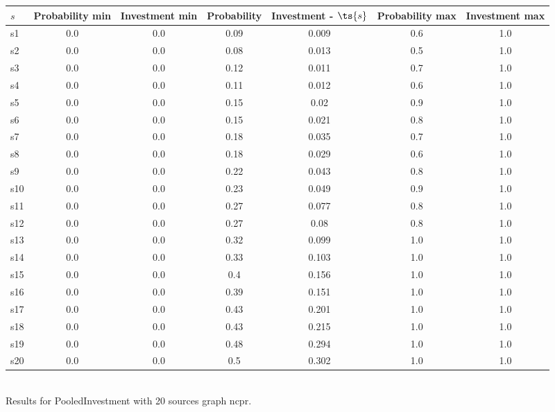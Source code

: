 \documentclass{article}
\begin{document}
\noindent\begin{tabular}{|l|c|c|c|c|c|c|}
\hline
$s$& Probability min & Investment min & Probability & Investment - $\ts{s}$ & Probability max & Investment max\\
\hline
s1 &0.0 & 0.0 & 0.09 & 0.009 & 0.6 & 1.0\\
\hline
s2 &0.0 & 0.0 & 0.08 & 0.013 & 0.5 & 1.0\\
\hline
s3 &0.0 & 0.0 & 0.12 & 0.011 & 0.7 & 1.0\\
\hline
s4 &0.0 & 0.0 & 0.11 & 0.012 & 0.6 & 1.0\\
\hline
s5 &0.0 & 0.0 & 0.15 & 0.02 & 0.9 & 1.0\\
\hline
s6 &0.0 & 0.0 & 0.15 & 0.021 & 0.8 & 1.0\\
\hline
s7 &0.0 & 0.0 & 0.18 & 0.035 & 0.7 & 1.0\\
\hline
s8 &0.0 & 0.0 & 0.18 & 0.029 & 0.6 & 1.0\\
\hline
s9 &0.0 & 0.0 & 0.22 & 0.043 & 0.8 & 1.0\\
\hline
s10 &0.0 & 0.0 & 0.23 & 0.049 & 0.9 & 1.0\\
\hline
s11 &0.0 & 0.0 & 0.27 & 0.077 & 0.8 & 1.0\\
\hline
s12 &0.0 & 0.0 & 0.27 & 0.08 & 0.8 & 1.0\\
\hline
s13 &0.0 & 0.0 & 0.32 & 0.099 & 1.0 & 1.0\\
\hline
s14 &0.0 & 0.0 & 0.33 & 0.103 & 1.0 & 1.0\\
\hline
s15 &0.0 & 0.0 & 0.4 & 0.156 & 1.0 & 1.0\\
\hline
s16 &0.0 & 0.0 & 0.39 & 0.151 & 1.0 & 1.0\\
\hline
s17 &0.0 & 0.0 & 0.43 & 0.201 & 1.0 & 1.0\\
\hline
s18 &0.0 & 0.0 & 0.43 & 0.215 & 1.0 & 1.0\\
\hline
s19 &0.0 & 0.0 & 0.48 & 0.294 & 1.0 & 1.0\\
\hline
s20 &0.0 & 0.0 & 0.5 & 0.302 & 1.0 & 1.0\\
\hline
\end{tabular}\\

\noindent Results for PooledInvestment with 20 sources graph ncpr.
\end{document}
